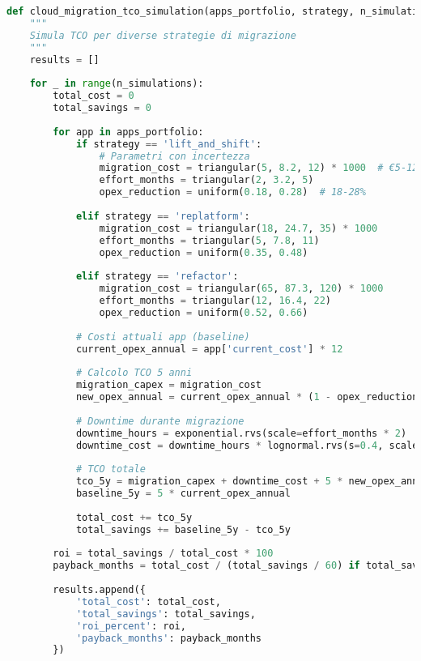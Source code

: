 \begin{lstlisting}[language=Python, caption=Simulazione TCO migrazione cloud]
def cloud_migration_tco_simulation(apps_portfolio, strategy, n_simulations=10000):
    """
    Simula TCO per diverse strategie di migrazione
    """
    results = []
    
    for _ in range(n_simulations):
        total_cost = 0
        total_savings = 0
        
        for app in apps_portfolio:
            if strategy == 'lift_and_shift':
                # Parametri con incertezza
                migration_cost = triangular(5, 8.2, 12) * 1000  # €5-12k
                effort_months = triangular(2, 3.2, 5)
                opex_reduction = uniform(0.18, 0.28)  # 18-28%
                
            elif strategy == 'replatform':
                migration_cost = triangular(18, 24.7, 35) * 1000
                effort_months = triangular(5, 7.8, 11)
                opex_reduction = uniform(0.35, 0.48)
                
            elif strategy == 'refactor':
                migration_cost = triangular(65, 87.3, 120) * 1000
                effort_months = triangular(12, 16.4, 22)
                opex_reduction = uniform(0.52, 0.66)
                
            # Costi attuali app (baseline)
            current_opex_annual = app['current_cost'] * 12
            
            # Calcolo TCO 5 anni
            migration_capex = migration_cost
            new_opex_annual = current_opex_annual * (1 - opex_reduction)
            
            # Downtime durante migrazione
            downtime_hours = exponential.rvs(scale=effort_months * 2)
            downtime_cost = downtime_hours * lognormal.rvs(s=0.4, scale=45000)
            
            # TCO totale
            tco_5y = migration_capex + downtime_cost + 5 * new_opex_annual
            baseline_5y = 5 * current_opex_annual
            
            total_cost += tco_5y
            total_savings += baseline_5y - tco_5y
            
        roi = total_savings / total_cost * 100
        payback_months = total_cost / (total_savings / 60) if total_savings > 0 else np.inf
        
        results.append({
            'total_cost': total_cost,
            'total_savings': total_savings,
            'roi_percent': roi,
            'payback_months': payback_months
        })
        

\end{lstlisting}
